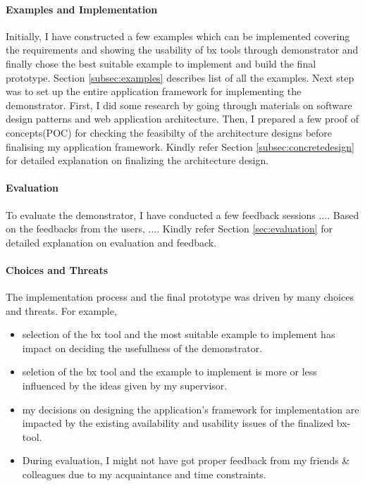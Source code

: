\paragraph{Examples and Implementation}
Initially, I have constructed a few examples which can be implemented covering the requirements and showing the usability of bx tools through demonstrator and finally chose the best suitable example to implement and build the final prototype. Section \ref{subsec:examples} describes list of all the examples.
\newline\newline Next step was to set up the entire application framework for implementing the demonstrator. First, I did some research by going through materials on software design patterns and web application architecture. Then, I prepared a few proof of concepts(POC) for checking the feasibilty of the architecture designs before finalising my application framework. Kindly refer Section \ref{subsec:concretedesign} for detailed explanation on finalizing the architecture design.
\paragraph{Evaluation} To evaluate the demonstrator, I have conducted a few feedback sessions ....
\newline\newline Based on the feedbacks from the users, .... Kindly refer Section \ref{sec:evaluation} for detailed explanation on evaluation and feedback.
\paragraph{Choices and Threats} 
The implementation process and the final prototype was driven by many choices and threats. For example, 
\begin{itemize} 
	\item {selection of the bx tool and the most suitable example to implement has impact on deciding the usefullness of the demonstrator.}
	\item {seletion of the bx tool and the example to implement is more or less influenced by the ideas given by my supervisor.} 
	\item {my decisions on designing the application's framework for implementation are impacted by the existing availability and usability issues of the finalized bx-tool.}
	\item {During evaluation, I might not have got proper feedback from my friends \& colleagues due to my acquaintance and time constraints.}
\end{itemize}

